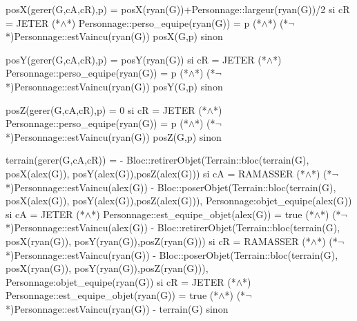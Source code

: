 \documentclass[a4paper, 11pt]{report}
\begin{document}
\begin{Spe}
	posX(gerer(G,cA,cR),p) = 
		posX(ryan(G))+Personnage::largeur(ryan(G))/2 si cR = JETER  (*$\land$*) Personnage::perso_equipe(ryan(G)) = p (*$\land$*) (*$\lnot$*)Personnage::estVaincu(ryan(G)) 
		posX(G,p) sinon
		
	posY(gerer(G,cA,cR),p) = 
		posY(ryan(G)) si cR = JETER (*$\land$*) Personnage::perso_equipe(ryan(G)) = p (*$\land$*) (*$\lnot$*)Personnage::estVaincu(ryan(G)) 
		posY(G,p) sinon
	
	posZ(gerer(G,cA,cR),p) = 
		0 si cR = JETER (*$\land$*) Personnage::perso_equipe(ryan(G)) = p (*$\land$*) (*$\lnot$*)Personnage::estVaincu(ryan(G)) 
		posZ(G,p) sinon


	terrain(gerer(G,cA,cR)) = 
	- Bloc::retirerObjet(Terrain::bloc(terrain(G), posX(alex(G)), posY(alex(G)),posZ(alex(G))) 
		si cA = RAMASSER (*$\land$*) (*$\lnot$*)Personnage::estVaincu(alex(G)) 
	- Bloc::poserObjet(Terrain::bloc(terrain(G), posX(alex(G)), posY(alex(G)),posZ(alex(G))), Personnage:objet_equipe(alex(G)) 
		si cA = JETER (*$\land$*) Personnage::est_equipe_objet(alex(G)) = true (*$\land$*) (*$\lnot$*)Personnage::estVaincu(alex(G)) 
	- Bloc::retirerObjet(Terrain::bloc(terrain(G), posX(ryan(G)), posY(ryan(G)),posZ(ryan(G))) 
		si cR = RAMASSER (*$\land$*) (*$\lnot$*)Personnage::estVaincu(ryan(G)) 
	- Bloc::poserObjet(Terrain::bloc(terrain(G), posX(ryan(G)), posY(ryan(G)),posZ(ryan(G))), Personnage:objet_equipe(ryan(G)) 
		si cR = JETER (*$\land$*) Personnage::est_equipe_objet(ryan(G)) = true (*$\land$*) (*$\lnot$*)Personnage::estVaincu(ryan(G)) 
	- terrain(G) sinon 
	
	



\end{Spe}
\end{document}
